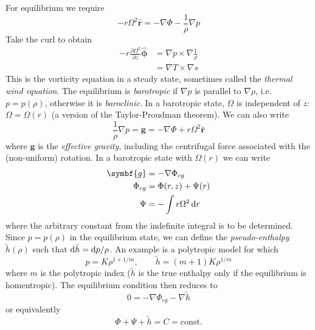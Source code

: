 \documentclass{jknotes}
\begin{document}
For equilibrium we require
\begin{equation}
	-r\Omega^2 \hat{\symbf{r}} = -\nabla \Phi - \frac{1}{\rho}\nabla p
\end{equation}
Take the curl to obtain
\begin{align}
	-r\frac{\partial \Omega^2}{\partial z} \hat{\symbf{\phi}} &= \nabla p
	\times \nabla \frac{1}{\rho} \label{eq:thermwind} \\
				&= \nabla T \times \nabla s
\end{align}
This is the vorticity equation in a steady state, sometimes called the
\emph{thermal wind equation}. The equilibrium is \emph{barotropic} if $\nabla
p$ is parallel to $\nabla \rho$, i.e. $p = p(\rho)$, otherwise it is
\emph{baroclinic}. In a barotropic state, $\Omega$ is independent of $z$:
$\Omega = \Omega(r)$ (a version of the Taylor-Proudman theorem). We can also
write
\begin{equation}
	\frac{1}{\rho}\nabla p = \symbf{g} = -\nabla \Phi + r\Omega^2
	\hat{\symbf{r}}
\end{equation}
where $\symbf{g}$ is the \emph{effective gravity}, including the centrifugal
force associated with the (non-uniform) rotation. In a barotropic state with
$\Omega(r)$ we can write
\begin{align}
	\symbf{g} &= - \nabla \Phi_{cg} \\
	\Phi_{cg} &= \Phi(r,z) + \Psi(r) \\
	\Psi &= -\int r\Omega^2 \, \diffd r
\end{align}
where the arbitrary constant from the indefinite integral is to be determined.
Since $p = p(\rho)$ in the equilibrium state, we can define the
\emph{pseudo-enthalpy} $\tilde{h}(\rho)$ such that $\diffd \tilde{h} = \diffd
p/\rho$. An example is a polytropic model for which
\begin{equation}
	p = K \rho^{1+1/m}, \hspace{2em} \tilde{h} = (m+1)K\rho^{1/m}
\end{equation}
where $m$ is the polytropic index ($\tilde{h}$ is the true enthalpy only if
the equilibrium is homentropic). The equilibrium condition then reduces to
\begin{equation}
	0 = -\nabla \Phi_{cg} - \nabla \tilde{h}
\end{equation}
or equivalently
\begin{equation}
	\Phi + \Psi + \tilde{h} = C = \text{const.} \label{eq:l23:1}
\end{equation}
\end{document}
